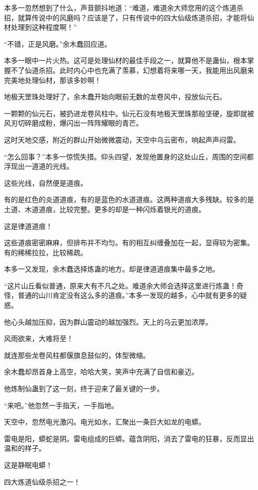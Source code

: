 \begin{this_body}
本多一忽然想到了什么，声音颤抖地道：“难道，难道余大师您用的这个炼道杀招，就算传说中的风磨吗？应该是了，只有传说中的四大仙级炼道杀招，才能将仙材处理到这种程度啊！”

“不错，正是风磨。”余木蠢回应道。

本多一眼中一片火热。这可是处理仙材的最佳手段之一，就算他不是蛊仙，根本掌握不了仙道杀招。此时内心中也充满了羡慕，幻想着将来哪一天，我能用出风磨来完美地处理仙材，那该多妙啊！

地极天罡珠处理好了，余木蠢开始向眼前无数的龙卷风中，投放仙元石。

一颗颗的仙元石，被扔进龙卷风柱中。仙元石没有地极天罡珠那般坚硬，旋即就被风刃切碎磨成粉，爆闪出一阵阵耀眼的青芒。

这时天地交感，附近的群山开始微微震动，天空中乌云密布，响起声声闷雷。

“怎么回事？”本多一惊慌失措。仰头四望，发现他置身的这处山丘，周围的空间都浮现出一道道的光线。

这些光线，自然便是道痕。

有的是红色的炎道道痕，有的是蓝色的水道道痕。这两种道痕大多残缺。较多的是土道、木道道痕，比较完整。更多的却是一种闪烁着银光的道痕。

这是律道道痕！

这些道痕密密麻麻，但排布并不均匀。有的相互纠缠叠加在一起，显得较为密集。有的稀稀拉拉，比较稀疏。

本多一又发现，余木蠢选择炼蛊的地方。却是律道道痕集中最多之地。

“这片山丘看似普通，原来大有不凡之处。难道余大师会选择这里进行炼蛊！奇怪，普通的山川肯定没有这么多的道痕。”本多一发现的越多，心中就有更多的疑惑。

他心头越加压抑，因为群山震动的越加强烈。天上的乌云更加浓厚。

风雨欲来，大难将至！

就连那些龙卷风柱都偃旗息鼓似的，体型微缩。

余木蠢却昂首身上高空，哈哈大笑，笑声中充满了自信和豪迈。

他炼制仙蛊到了这一刻，终于迎来了最关键的一步。

“来吧。”他忽然一手指天，一手指地。

天空中，忽然电光激闪。电光如水，汇聚出一条巨大如龙的电蟒。

雷电是阳，蟒蛇是阴。雷电组成的巨蟒。蕴含阴阳，消去了雷电的狂暴，反而显出温和的样子。

这是静眠电蟒！

四大炼道仙级杀招之一！


\end{this_body}
